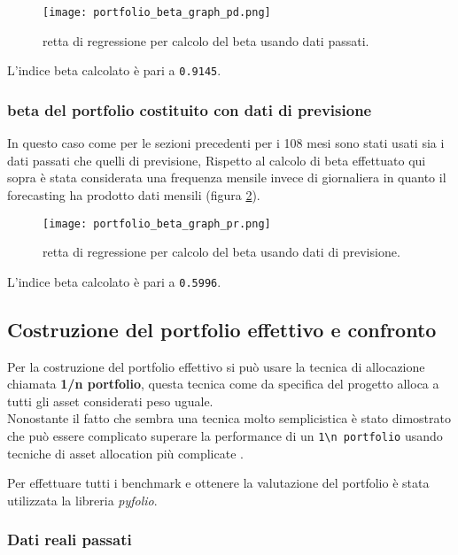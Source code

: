 \begin{figure}[ht]
    \centering
    \texttt{[image: portfolio\_beta\_graph\_pd.png]}
    \caption{retta di regressione per calcolo del beta usando dati passati.}
    \label{fig:pf_optima_pd_beta_graph}
\end{figure}

L'indice beta calcolato è pari a \verb|0.9145|.

\pagebreak

\subsubsection{beta del portfolio costituito con dati di previsione}

In questo caso come per le sezioni precedenti per i 108 mesi sono stati usati sia i dati passati che quelli di previsione,
Rispetto al calcolo di beta effettuato qui sopra è stata considerata una frequenza mensile invece di giornaliera in quanto
il forecasting ha prodotto dati mensili (figura \ref{fig:pf_optima_pr_beta_graph}).

\begin{figure}[ht]
    \centering
    \texttt{[image: portfolio\_beta\_graph\_pr.png]}
    \caption{retta di regressione per calcolo del beta usando dati di previsione.}
    \label{fig:pf_optima_pr_beta_graph}
\end{figure}

L'indice beta calcolato è pari a \verb|0.5996|.

\subsection{Costruzione del portfolio effettivo e confronto}

Per la costruzione del portfolio effettivo si può usare la tecnica di allocazione chiamata \textbf{1/n portfolio}, questa
tecnica come da specifica del progetto alloca a tutti gli asset considerati peso uguale.\\
Nonostante il fatto che sembra una tecnica molto semplicistica è stato 
dimostrato  che può essere complicato superare la performance di un \verb|1\n portfolio| usando tecniche di asset allocation più complicate \cite{10.1093/rfs/hhm075}.

Per effettuare tutti i benchmark e ottenere la valutazione del portfolio è stata utilizzata la libreria \emph{pyfolio}.

\subsubsection{Dati reali passati}

